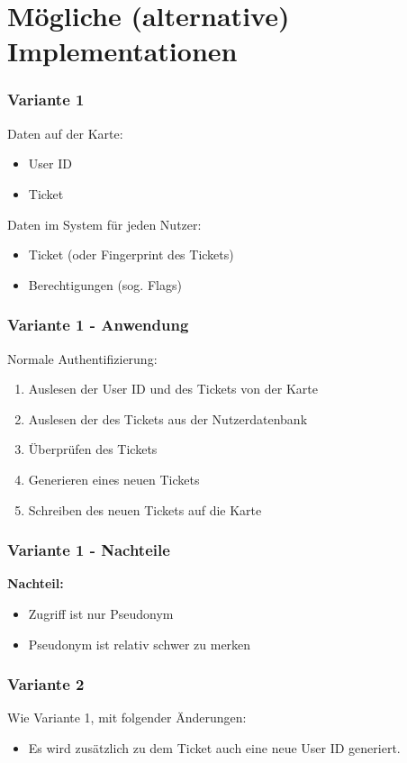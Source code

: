 \section{Mögliche (alternative) Implementationen}
\begin{frame}
	\frametitle{Variante 1}
	Daten auf der Karte:
	\begin{itemize}
		\item<2-> User ID
		\item<3-> Ticket
	\end{itemize}
	Daten im System für jeden Nutzer:
	\begin{itemize}
		\item<4-> Ticket (oder Fingerprint des Tickets)
		\item<5-> Berechtigungen (sog. Flags)
	\end{itemize}
\end{frame}

\begin{frame}
	\frametitle{Variante 1 - Anwendung}
	Normale Authentifizierung:
	\begin{enumerate}
	\item<2-> Auslesen der User ID und des Tickets von der Karte
	\item<3-> Auslesen der des Tickets aus der Nutzerdatenbank
	\item<4-> Überprüfen des Tickets
	\item<5-> Generieren eines neuen Tickets
	\item<6-> Schreiben des neuen Tickets auf die Karte
	\end{enumerate}
\end{frame}

\begin{frame}
	\frametitle{Variante 1 - Nachteile}
	\textbf<2->{Nachteil:}
	\begin{itemize}
		\item<2-> Zugriff ist nur Pseudonym
		\item<3-> Pseudonym ist relativ schwer zu merken
	\end{itemize}
\end{frame}

\begin{frame}
	\frametitle{Variante 2}
	Wie Variante 1, mit folgender Änderungen:
	\begin{itemize}
		\item<2-> Es wird zusätzlich zu dem Ticket auch eine neue User ID generiert.
	\end{itemize}
\end{frame}

